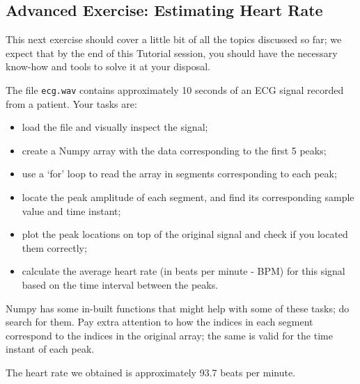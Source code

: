 \subsection{Advanced Exercise: Estimating Heart Rate}

This next exercise should cover a little bit of all the topics discussed so far; we expect that by the end of this Tutorial session, you should have the necessary know-how and tools to solve it at your disposal.

The file {\tt ecg.wav} contains approximately 10 seconds of an ECG signal recorded from a patient. Your tasks are:

\begin{itemize}
	\item load the file and visually inspect the signal;
	\item create a Numpy array with the data corresponding to the first 5 peaks;
	\item use a `for' loop to read the array in segments corresponding to each peak;
	\item locate the peak amplitude of each segment, and find its corresponding sample value and time instant;
	\item plot the peak locations on top of the original signal and check if you located them correctly;
	\item calculate the average heart rate (in beats per minute - BPM) for this signal based on the time interval between the peaks.
\end{itemize}

Numpy has some in-built functions that might help with some of these tasks; do search for them. Pay extra attention to how the indices in each segment correspond to the indices in the original array; the same is valid for the time instant of each peak.

The heart rate we obtained is approximately 93.7 beats per minute.